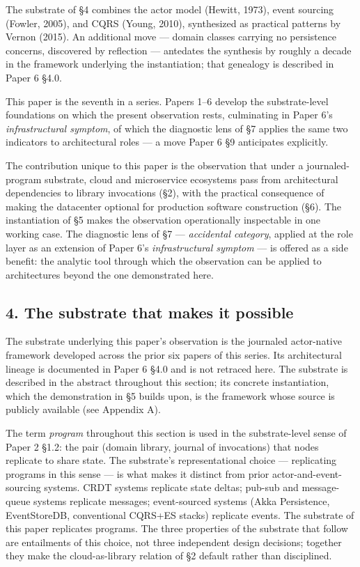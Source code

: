 \documentclass[
]{article}
\begin{document}
The substrate of §4 combines the actor model (Hewitt, 1973), event
sourcing (Fowler, 2005), and CQRS (Young, 2010), synthesized as
practical patterns by Vernon (2015). An additional move --- domain
classes carrying no persistence concerns, discovered by reflection ---
antedates the synthesis by roughly a decade in the framework underlying
the instantiation; that genealogy is described in Paper 6 §4.0.

This paper is the seventh in a series. Papers 1--6 develop the
substrate-level foundations on which the present observation rests,
culminating in Paper 6's \emph{infrastructural symptom}, of which the
diagnostic lens of §7 applies the same two indicators to architectural
roles --- a move Paper 6 §9 anticipates explicitly.

The contribution unique to this paper is the observation that under a
journaled-program substrate, cloud and microservice ecosystems pass from
architectural dependencies to library invocations (§2), with the
practical consequence of making the datacenter optional for production
software construction (§6). The instantiation of §5 makes the
observation operationally inspectable in one working case. The
diagnostic lens of §7 --- \emph{accidental category}, applied at the
role layer as an extension of Paper 6's \emph{infrastructural symptom}
--- is offered as a side benefit: the analytic tool through which the
observation can be applied to architectures beyond the one demonstrated
here.

\subsection{4. The substrate that makes it
possible}\label{the-substrate-that-makes-it-possible}

The substrate underlying this paper's observation is the journaled
actor-native framework developed across the prior six papers of this
series. Its architectural lineage is documented in Paper 6 §4.0 and is
not retraced here. The substrate is described in the abstract throughout
this section; its concrete instantiation, which the demonstration in §5
builds upon, is the framework whose source is publicly available (see
Appendix A).

The term \emph{program} throughout this section is used in the
substrate-level sense of Paper 2 §1.2: the pair (domain library, journal
of invocations) that nodes replicate to share state. The substrate's
representational choice --- replicating programs in this sense --- is
what makes it distinct from prior actor-and-event-sourcing systems. CRDT
systems replicate state deltas; pub-sub and message-queue systems
replicate messages; event-sourced systems (Akka Persistence,
EventStoreDB, conventional CQRS+ES stacks) replicate events. The
substrate of this paper replicates programs. The three properties of the
substrate that follow are entailments of this choice, not three
independent design decisions; together they make the cloud-as-library
relation of §2 default rather than disciplined.
\end{document}
